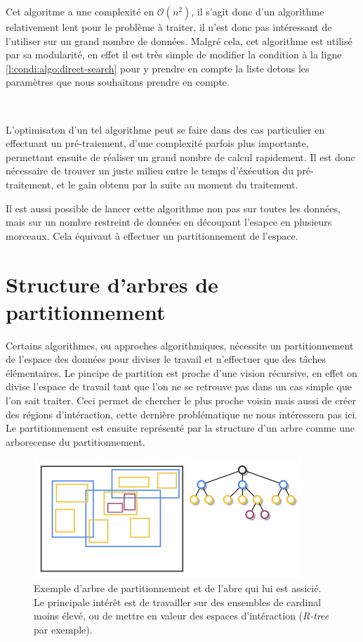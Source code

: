 Cet algoritme a une complexité en $\mathcal{O}(n^{2})$, il s'agit donc d'un algorithme relativement lent pour le problème à traiter, il n'est donc pas intéressant de l'utiliser sur un grand nombre de données. Malgré cela, cet algorithme est utilisé par sa modularité, en effet il est très simple de modifier la condition à la ligne \ref{l:condi:algo:direct-search} pour y prendre en compte la liste detous les paramètres que nous souhaitons prendre en compte.

\

L'optimisaton d'un tel algorithme peut se faire dans des cas particulier en effectuant un pré-traiement, d'une complexité parfois plus importante, permettant ensuite de réaliser un grand nombre de calcul rapidement. Il est donc nécessaire de trouver un juste milieu entre le temps d'éxécution du pré-traitement, et le gain obtenu par la suite au moment du traitement.

Il est aussi possible de lancer cette algorithme non pas sur toutes les données, mais sur un nombre restreint de données en découpant l'esapce en plusieurs morceaux. Cela équivaut à effectuer un partitionnement de l'espace.


\section[Arbres de partitionnement]{Structure d'arbres de partitionnement}

Certains algorithmes, ou approches algorithmiques, nécessite un partitionnement de l'espace des données pour diviser le travail et n'effectuer que des tâches élémentaires. Le pincipe de partition est proche d'une vision récursive, en effet on divise l'espace de travail tant que l'on ne se retrouve pas dans un cas simple que l'on sait traiter. Ceci permet de chercher le plus proche voisin mais aussi de créer des régions d'intéraction, cette dernière problématique ne nous intéressera pas ici. Le partitionnement est ensuite représenté par la structure d'un arbre comme une arborecense du partitionnement.

	\begin{figure}[h]
		\centering
		\includegraphics[width=0.9\textwidth]{img/rtree.png}
		\caption[Exemple de partitionnement et d'arbre associé]{Exemple d'arbre de partitionnement et de l'abre qui lui est assicié. Le principale intérêt est de travailler sur des ensembles de cardinal moins élevé, ou de mettre en valeur des espaces d'intéraction (\emph{R-tree} par exemple).}
	\end{figure}

